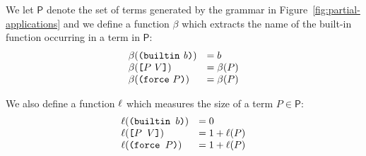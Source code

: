 \medskip
\noindent We let $\textsf{P}$ denote the set of terms generated by the grammar
in Figure~\ref{fig:partial-applications} and 
we define a function $\beta$ which extracts the name of the built-in
function occurring in a term in $\textsf{P}$:
$$
 \begin{array}{ll}
 \beta(\texttt{(} \texttt{builtin} ~ \mathit{b} \texttt{)}) &= b\\
 \beta(\texttt{[} P ~ V \texttt{]}) & =\beta(P)\\
 \beta({\texttt{(} \texttt{force} ~ P \texttt{)}}) & =\beta(P)\\
\end{array}
$$



\noindent We also define a function $\operatorname{\ell}$ which measures the size of a term $P \in \textsf{P}$:
$$
\begin{array}{ll}
\operatorname{\ell}(\texttt{(builtin $b$)}) &= 0\\
\operatorname{\ell}(\texttt{[$P$ $V$]}) &= 1+\operatorname{\ell}(P)\\
\operatorname{\ell}(\texttt{(force $P$)}) & = 1+\operatorname{\ell}(P)
\end{array}
$$




